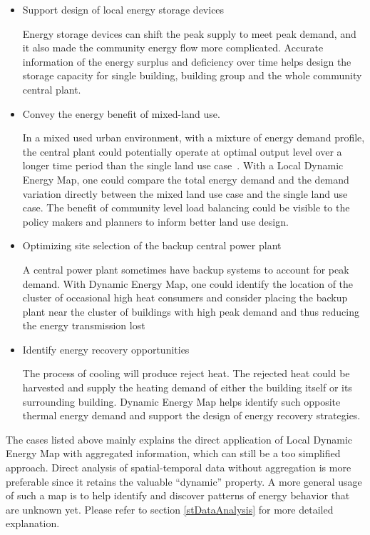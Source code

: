 \documentclass[hidelinks,12pt]{article}
\begin{document}
\begin{itemize}
\item Support design of local energy storage devices

  Energy storage devices can shift the peak supply to meet peak
  demand, and it also made the community energy flow more
  complicated. Accurate information of the energy surplus and
  deficiency over time helps design the storage capacity for single
  building, building group and the whole community central plant.

\item Convey the energy benefit of mixed-land use.

  In a mixed used urban environment, with a mixture of energy demand
  profile, the central plant could potentially operate at optimal
  output level over a longer time period than the single land use
  case~\cite{IDEA2005}. With a Local Dynamic Energy Map, one could
  compare the total energy demand and the demand variation directly
  between the mixed land use case and the single land use case. The
  benefit of community level load balancing could be visible to the
  policy makers and planners to inform better land use design.
  
\item Optimizing site selection of the backup central power plant

  A central power plant sometimes have backup systems to account for
  peak demand. With Dynamic Energy Map, one could identify the
  location of the cluster of occasional high heat consumers and
  consider placing the backup plant near the cluster of buildings with
  high peak demand and thus reducing the energy transmission lost

\item Identify energy recovery opportunities

  The process of cooling will produce reject heat. The rejected heat
  could be harvested and supply the heating demand of either the
  building itself or its surrounding building. Dynamic Energy Map
  helps identify such opposite thermal energy demand and support the
  design of energy recovery strategies.

\end{itemize}
The cases listed above mainly explains the direct application of Local
Dynamic Energy Map with aggregated information, which can still be a
too simplified approach. Direct analysis of spatial-temporal data
without aggregation is more preferable since it retains the valuable
``dynamic'' property. A more general usage of such a map is to help
identify and discover patterns of energy behavior that are unknown
yet. Please refer to section \ref{stDataAnalysis} for more detailed
explanation.
\end{document}
